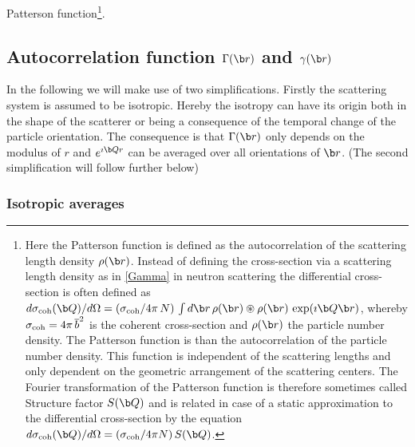  Patterson function\footnote{Here the Patterson function is defined as the autocorrelation
 of the scattering length density $\rho(\B{r})$. Instead of defining the cross-section via
 a scattering length density as in \ref{Gamma} in neutron scattering the differential
 cross-section is often defined as
  ${d\sigma_{\rm coh}(\B{Q})}/{d\Omega} = ({\sigma_{\rm coh}}/{4 \pi\,N})\, \int
d\B{r}\,  \rho(\B{r}) \circledast \rho(\B{r})
\,\exp(\imath\B{Q}\B{r})$, whereby $\sigma_{\rm coh} = 4 \pi\,
\overline{b}^2$ is the coherent cross-section and
$\rho(\B{r})$ the particle number density. The Patterson function
is than the autocorrelation of the particle number density. This function is independent
of the scattering lengths and only dependent on the geometric arrangement of the scattering
centers. The Fourier transformation of the Patterson function is therefore sometimes
called Structure factor $S(\B{Q})$ and is related in case of a static approximation to
the differential cross-section by the equation
$d\sigma_{\rm coh}(\B{Q})/d\Omega = (\sigma_{\rm coh}/4\pi N)\, S(\B{Q})$.}.

\subsection{Autocorrelation function $\Gamma(\B{r})$ and $\gamma(\B{r})$}

In the following we will make use of two simplifications. Firstly the scattering system
is assumed to be isotropic. Hereby the isotropy can have its origin both in the shape of the
scatterer or being a consequence of the temporal change of the particle orientation.
The consequence is that $\Gamma(\B{r})$ only depends on the modulus of $r$
and $e^{\imath\B{Qr}}$ can be averaged over all orientations of $\B{r}$. (The second
simplification will follow further below)

\subsubsection{Isotropic averages}

